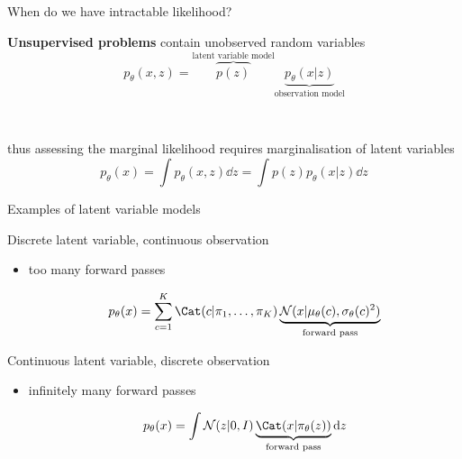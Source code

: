 \begin{frame}{When do we have intractable likelihood?}

{\bf Unsupervised problems} contain unobserved random variables\\ 
\begin{equation*}
p_\theta(x, z) = \overbrace{p(z)}^{\text{latent variable model}} \underbrace{p_\theta(x|z)}_{\text{observation model}}
\end{equation*}

~ \pause

thus assessing the marginal likelihood requires \alert{marginalisation of latent variables} 
\begin{equation*}
p_\theta(x) = \int p_\theta(x, z) \dd{z} = \int p(z)p_\theta(x|z) \dd{z} 
\end{equation*}


\end{frame}

\begin{frame}{Examples of latent variable models}

Discrete latent variable, continuous observation
\begin{itemize}
	\item too many forward passes
	\begin{small}
	\begin{equation*}
	p_\theta(x) = \sum_{c=1}^K \Cat(c|\pi_1, \ldots, \pi_K) \underbrace{\mathcal N(x|\mu_\theta(c), \sigma_\theta(c)^2)}_{\text{forward pass}}
	\end{equation*}
	\end{small}
\end{itemize}
	\pause
	
Continuous latent variable, discrete observation
\begin{itemize}
	\item infinitely many forward passes
	\begin{small}
	\begin{equation*}
	p_\theta(x) = \int \mathcal N(z|0, I) \underbrace{\Cat(x|\pi_\theta(z))}_{\text{forward pass}} \mathrm{d}z
	\end{equation*}
	\end{small}
\end{itemize}

\end{frame}

